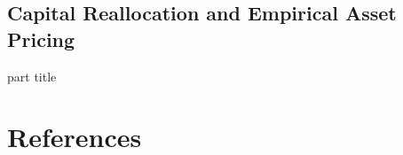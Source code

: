 \documentclass[11pt]{beamer}
\begin{document}
\begin{CJK*}{UTF8}{gkai}
\subsection{Capital Reallocation and Empirical Asset Pricing}
\begin{frame}
	\begin{centering}
		{\small \begin{beamercolorbox}[center]{part title}
				\insertsubsection\par
		\end{beamercolorbox}}
	\end{centering}
\end{frame}

\section{References}
\begin{frame}
	\sectionpage
\end{frame}




\end{CJK*}
\end{document}
